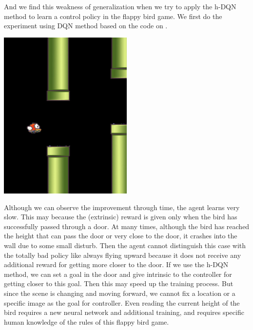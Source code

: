 \documentclass{article}
\newcommand{\Acknowledgement}[1]{\ \\{\bf Acknowledgement:} #1}
\begin{document}
\begin{spacing}{1.1}
    And we find this weakness of generalization when we try to apply the h-DQN method to learn a control policy in the flappy bird game. We first do the experiment using DQN method based on the code on \cite{github2}.
    \begin{center}
        \includegraphics[width = 0.5\textwidth]{Fluppy.png}
    \end{center}
    
    Although we can observe the improvement through time, the agent learns very slow. This may because the (extrinsic) reward is given only when the bird has successfully passed through a door. At many times, although the bird has reached the height that can pass the door or very close to the door, it crashes into the wall due to some small disturb. Then the agent cannot distinguish this case with the totally bad policy like always flying upward because it does not receive any additional reward for getting more closer to the door. If we use the h-DQN method, we can set a goal in the door and give intrinsic to the controller for getting closer to this goal. Then this may speed up the training process. But since the scene is changing and moving forward, we cannot fix a location or a specific image as the goal for controller. Even reading the current height of the bird requires a new neural network and additional training, and requires specific human knowledge of the rules of this flappy bird game.

    
    



    \end{spacing}
    
\end{document}

